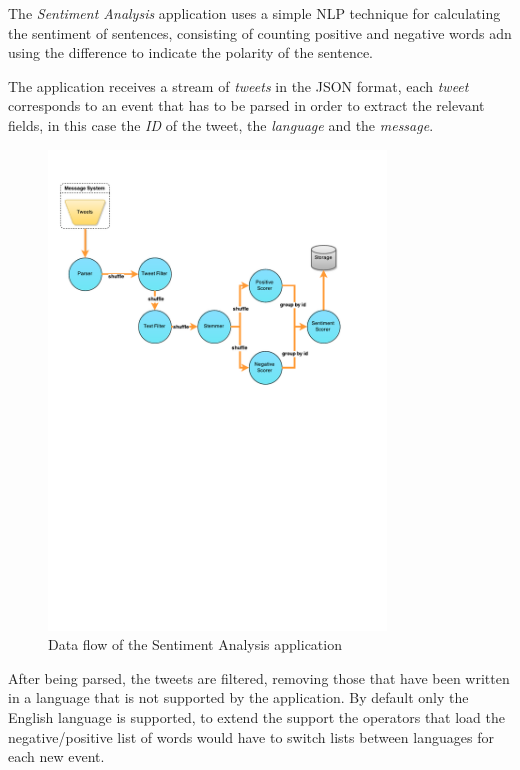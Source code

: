 \documentclass[ppgc,diss,english]{iiufrgs}
\begin{document}
The \emph{Sentiment Analysis} application uses a simple NLP technique for calculating the sentiment of sentences, consisting of counting positive and negative words adn using the difference to indicate the polarity of the sentence.

The application receives a stream of \emph{tweets} in the JSON format, each \emph{tweet} corresponds to an event that has to be parsed in order to extract the relevant fields, in this case the \emph{ID} of the tweet, the \emph{language} and the \emph{message}.

\begin{figure}[!ht]
	\centering
	\includegraphics[width=0.8\textwidth]{images/apps/TwitterSentiment2.pdf}
	\caption{Data flow of the Sentiment Analysis application}
	\label{fig:app_sentiment_analysis}
\end{figure}

After being parsed, the tweets are filtered, removing those that have been written in a language that is not supported by the application. By default only the English language is supported, to extend the support the operators that load the negative/positive list of words would have to switch lists between languages for each new event.
\end{document}
